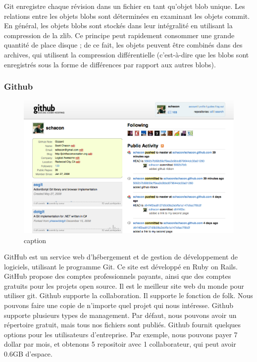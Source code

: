 Git enregistre chaque révision dans un fichier en tant qu'objet blob unique. Les relations entre les objets blobs sont déterminées en examinant les objets commit. En général, les objets blobs sont stockés dans leur intégralité en utilisant la compression de la zlib. Ce principe peut rapidement consommer une grande quantité de place disque ; de ce fait, les objets peuvent être combinés dans des archives, qui utilisent la compression différentielle (c'est-à-dire que les blobs sont enregistrés sous la forme de différences par rapport aux autres blobs).

\subsubsection{Github} %


\begin{figure}[htbp]
	\centering
		\includegraphics[width=6in]{Image/githubCapture.png}
	\caption{caption}
	\label{fig:Image_githubCapture}
\end{figure}


GitHub est un service web d'hébergement et de gestion de développement de logiciels, utilisant le programme Git. Ce site est développé en Ruby on Rails. GitHub propose des comptes professionnels payants, ainsi que des comptes gratuits pour les projets open source. Il est le meilleur site web du monde pour utiliser git. Github supporte la collaboration. Il supporte le fonction de folk. Nous pouvons faire une copie de n'importe quel projet qui nous intéresse. Github supporte plusieurs types de management. Par défaut, nous pouvons avoir un répertoire gratuit, mais tous nos fichiers sont publiés. Github fournit quelques options pour les utilisateurs d'entreprise. Par exemple, nous pouvons payer 7 dollar par mois, et obtenons 5 repositoir avec 1 collaborateur, qui peut avoir 0.6GB d'espace. 

